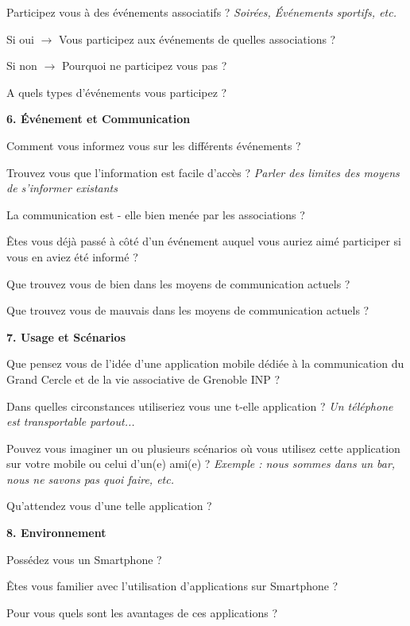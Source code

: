 \documentclass[a4paper, 11px]{article}
\begin{document}
Participez vous à des événements associatifs ?
\textit{Soirées, Événements sportifs, etc.}

Si oui $\rightarrow$ Vous participez aux événements de quelles associations ?

Si non $\rightarrow$ Pourquoi ne participez vous pas ?

A quels types d'événements vous participez ?


\vspace{.3cm}

 \textbf {\large 6. Événement et Communication}

Comment vous informez vous sur les différents événements ?

Trouvez vous que l'information est facile d'accès ?
\textit{Parler des limites des moyens de s'informer existants}


La communication est - elle bien menée par les associations ?

Êtes vous déjà passé à côté d'un événement auquel vous auriez aimé participer si vous en aviez été informé ?

Que trouvez vous de bien dans les moyens de communication actuels ?


Que trouvez vous de mauvais dans les moyens de communication actuels ?


\vspace{.3cm}

 \textbf {\large 7. Usage et Scénarios}

Que pensez vous de l'idée d'une application mobile dédiée à la communication du Grand Cercle et de la vie associative de Grenoble INP ?


Dans quelles circonstances utiliseriez vous une t-elle application ?
\textit{Un téléphone est transportable partout...}


Pouvez vous imaginer un ou plusieurs scénarios où vous utilisez cette application sur votre mobile ou celui d'un(e) ami(e) ?
\textit{Exemple : nous sommes dans un bar, nous ne savons pas quoi faire, etc.}

Qu'attendez vous d'une telle application ?


\vspace{.3cm}

 \textbf {\large 8. Environnement}

Possédez vous un Smartphone ?

Êtes vous familier avec l'utilisation d'applications sur Smartphone ?

Pour vous quels sont les avantages de ces applications ?
\end{document}

